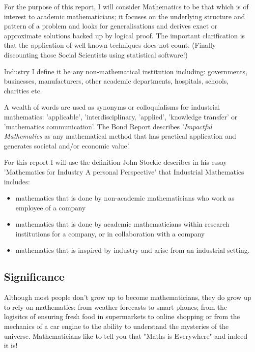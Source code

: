 \documentclass[11pt]{article} %
\begin{document}
	
	For the purpose of this report, I  will consider Mathematics to be that which is of interest to academic mathematicians; it focuses  on the underlying structure and pattern of a problem and  looks for generalisations and derives exact or approximate solutions backed up by logical proof. The important clarification is that the application of well known techniques does not count. (Finally discounting those Social Scientists using statistical software!)
	
	
 Industry  I define it be any non-mathematical institution including: governments, businesses, manufacturers, other academic departments, hospitals, schools, charities etc. 


		A wealth of words are used as synonyms or colloquialisms for industrial mathematics: 'applicable', 'interdisciplinary, 'applied', 'knowledge transfer' or 'mathematics communication'. The Bond Report \cite{Bond} describes '\textit{Impactful Mathematics} as any mathematical method that has practical application and generates societal and/or economic value'. 
		
		For this report I will use the definition John Stockie describes in his essay 'Mathematics for Industry A personal Perspective' \cite{Stockie2015} that Industrial Mathematics includes: 
		
	\begin{itemize}
	\item mathematics that is done by non-academic mathematicians who work as employee of a company
	\item mathematics that is done by academic mathematicians within research institutions for a company, or in collaboration with a company
	\item mathematics that is inspired by industry and arise from an industrial setting. 
	\end{itemize}
	
	
	\subsection{Significance}
	
Although most people don't grow up to become mathematicians, they do grow up to rely on mathematics: from weather forecasts to smart phones; from the logisitcs of ensuring fresh food in supermarkets to online shopping or from the mechanics of a car engine to  the ability to understand the mysteries of the universe. Mathematicians like to tell you that "Maths is Everywhere" and indeed it is! 
\end{document}
